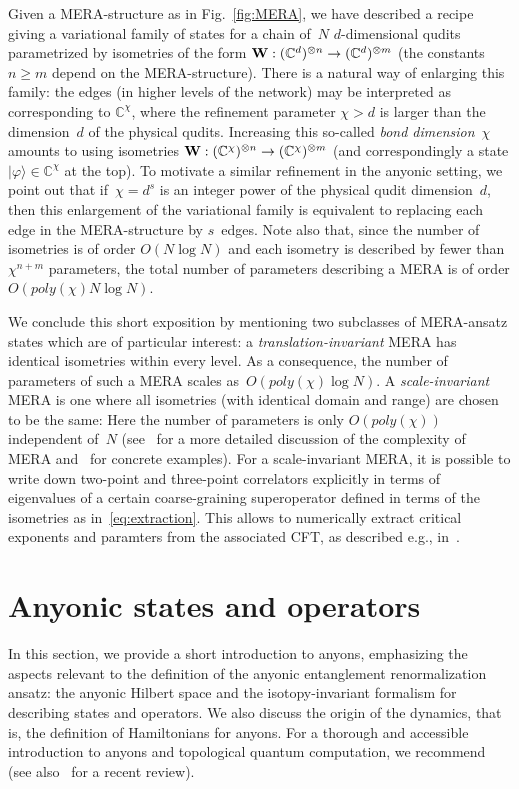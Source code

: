 \documentclass[floats,prb,twocolumn]{revtex4}
\newcommand{\ket}[1]{|#1\rangle}
\newcommand*{\Xisometry}{{\bf W}}
\begin{document}
Given a MERA-structure as in Fig.~\ref{fig:MERA}, we have described a recipe giving a variational family of states for a chain of~$N$ $d$-dimensional qudits parametrized by isometries of the form  $\Xisometry:(\mathbb{C}^{d})^{\otimes n}\rightarrow(\mathbb{C}^d)^{\otimes m}$ (the constants~$n\geq m$ depend on the MERA-structure). There is a natural way of enlarging this family: the edges (in higher levels of the  network) may be interpreted as corresponding to $\mathbb{C}^\chi$, where the refinement parameter $\chi>d$ is larger than the dimension~$d$ of the physical qudits. Increasing this so-called {\em bond dimension}~$\chi$ amounts  to using isometries $\Xisometry:(\mathbb{C}^{\chi})^{\otimes n}\rightarrow(\mathbb{C}^\chi)^{\otimes m}$ (and correspondingly a state $\ket{\varphi}\in\mathbb{C}^\chi$ at the top). To motivate a similar refinement in the anyonic setting, we point out that if~$\chi=d^s$ is an integer power of the physical qudit dimension~$d$, then this enlargement of the variational family is equivalent to replacing each edge in the MERA-structure by $s$~edges. Note also that, since the number of isometries is of order $O(N\log N)$ and each isometry is described by fewer than~$\chi^{n+m}$ parameters, the total number of parameters describing a MERA is of order $O(poly(\chi) N\log N)$. 


We conclude this short exposition  by mentioning two subclasses of MERA-ansatz states which are of particular interest: a {\em translation-invariant} MERA has identical isometries within every level. As a consequence,  the number of parameters  of such a MERA scales as~$O(poly(\chi)\log N)$. A {\em scale-invariant} MERA is one where all isometries (with identical domain and range) are chosen to be the same: Here the number of parameters is only $O(poly(\chi))$ independent of~$N$ (see~\cite{Vidal08} for a more detailed discussion of the complexity of MERA and~\cite{evenblyvidal09} for concrete examples). For a scale-invariant MERA, it is possible to write down two-point and three-point correlators explicitly in terms of eigenvalues of a certain coarse-graining superoperator defined in terms of the isometries as in~\eqref{eq:extraction}. This allows to numerically extract critical exponents and paramters from the associated CFT, as described e.g., in~\cite{Giovannettietal08,Pfeiferetal09,silvietal09}.

 


\section{Anyonic states and operators\label{sec:anyonicformalism}}
In this section, we provide a short introduction to anyons, emphasizing the aspects relevant to the definition of the anyonic entanglement renormalization ansatz: the anyonic Hilbert space and the isotopy-invariant formalism for describing states and operators. We also discuss the origin of the dynamics, that is, the definition of Hamiltonians for anyons. For a thorough and accessible introduction to anyons and topological quantum computation, we recommend~\cite{preskill} (see also~\cite{Nayaketal08} for a recent review). 
\end{document}
